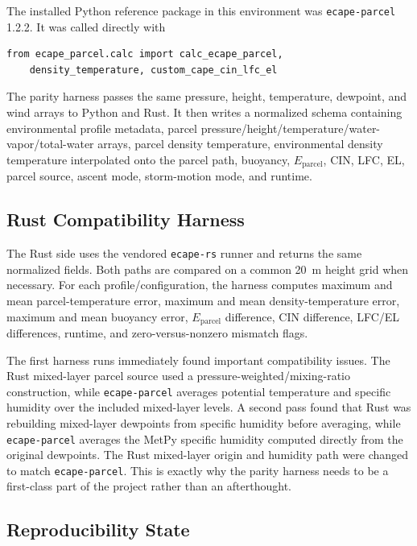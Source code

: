 \documentclass[11pt]{article}
\begin{document}
The installed Python reference package in this environment was \texttt{ecape-parcel} 1.2.2. It was called directly with

\begin{verbatim}
from ecape_parcel.calc import calc_ecape_parcel,
    density_temperature, custom_cape_cin_lfc_el
\end{verbatim}

The parity harness passes the same pressure, height, temperature, dewpoint, and wind arrays to Python and Rust. It then writes a normalized schema containing environmental profile metadata, parcel pressure/height/temperature/water-vapor/total-water arrays, parcel density temperature, environmental density temperature interpolated onto the parcel path, buoyancy, $E_{\mathrm{parcel}}$, CIN, LFC, EL, parcel source, ascent mode, storm-motion mode, and runtime.

\subsection{Rust Compatibility Harness}

The Rust side uses the vendored \texttt{ecape-rs} runner and returns the same normalized fields. Both paths are compared on a common \SI{20}{m} height grid when necessary. For each profile/configuration, the harness computes maximum and mean parcel-temperature error, maximum and mean density-temperature error, maximum and mean buoyancy error, $E_{\mathrm{parcel}}$ difference, CIN difference, LFC/EL differences, runtime, and zero-versus-nonzero mismatch flags.

The first harness runs immediately found important compatibility issues. The Rust mixed-layer parcel source used a pressure-weighted/mixing-ratio construction, while \texttt{ecape-parcel} averages potential temperature and specific humidity over the included mixed-layer levels. A second pass found that Rust was rebuilding mixed-layer dewpoints from specific humidity before averaging, while \texttt{ecape-parcel} averages the MetPy specific humidity computed directly from the original dewpoints. The Rust mixed-layer origin and humidity path were changed to match \texttt{ecape-parcel}. This is exactly why the parity harness needs to be a first-class part of the project rather than an afterthought.

\subsection{Reproducibility State}
\end{document}
